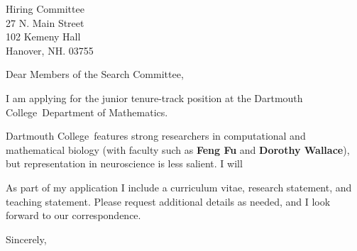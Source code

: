 \documentclass[11pt,a4paper]{letter}
\begin{document}

\def\School{Dartmouth College}

\begin{letter}
{Hiring Committee\\
27 N. Main Street\\
102 Kemeny Hall\\
Hanover, NH. 03755}


\opening{Dear Members of the Search Committee,} 

I am applying for the junior tenure-track position at the \School~Department of Mathematics. 



\School~features strong researchers in computational and mathematical biology (with faculty such as \textbf{Feng Fu} and \textbf{Dorothy Wallace}), but representation in neuroscience is less salient. I will 



As part of my application I include a curriculum vitae, research statement, and teaching statement. Please request additional details as needed, and I look forward to our correspondence.

\closing{Sincerely,}
\end{letter}
\end{document}

